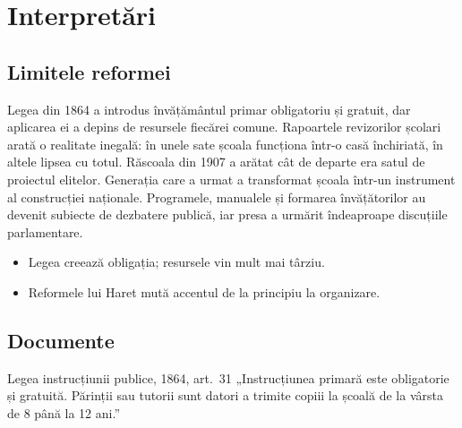 \documentclass{texign-book}
\newcommand\Para{Legea din 1864 a introdus învățământul primar obligatoriu și gratuit, dar aplicarea ei a depins de resursele fiecărei comune. Rapoartele revizorilor școlari arată o realitate inegală: în unele sate școala funcționa într-o casă închiriată, în altele lipsea cu totul.}
\newcommand\ParaB{Generația care a urmat a transformat școala într-un instrument al construcției naționale. Programele, manualele și formarea învățătorilor au devenit subiecte de dezbatere publică, iar presa a urmărit îndeaproape discuțiile parlamentare.}
\begin{document}
\part{Interpretări}

\chapter{Limitele reformei}
\Para\cite[115]{murgescu2010} Răscoala din 1907 a arătat cât de departe era satul de proiectul elitelor.\cite[Cf.][18-21]{bourdieu1970} \ParaB\cite[cap.~5]{hitchins1994}

\begin{summary}
\begin{itemize}
\item Legea creează obligația; resursele vin mult mai târziu.
\item Reformele lui Haret mută accentul de la principiu la organizare.
\end{itemize}
\end{summary}

\appendix
\chapter{Documente}
\begin{source}{Legea instrucțiunii publice, 1864, art.~31}
„Instrucțiunea primară este obligatorie și gratuită. Părinții sau tutorii sunt datori a trimite copiii la școală de la vârsta de 8 până la 12 ani.”
\end{source}

\backmatter
\printsources
\printterms
\listoffigures
\listoftables
\printindex
\end{document}
